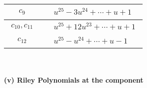 \documentclass[1p]{elsarticle_modified}
\theoremstyle{definition}
\begin{document}
\begin{tabular}{m{50pt}|m{274pt}}
\hline $$\begin{aligned}c_{9}\end{aligned}$$&$\begin{aligned}
&u^{25}-3 u^{24}+\cdots+u+1
\end{aligned}$\\
\hline $$\begin{aligned}c_{10},c_{11}\end{aligned}$$&$\begin{aligned}
&u^{25}+12 u^{23}+\cdots+u+1
\end{aligned}$\\
\hline $$\begin{aligned}c_{12}\end{aligned}$$&$\begin{aligned}
&u^{25}- u^{24}+\cdots+u-1
\end{aligned}$\\
\hline
\end{tabular}\\~\\
\newpage\renewcommand{\arraystretch}{1}
\flushleft \textbf{(v) Riley Polynomials at the component}\newline \\
\end{document}
